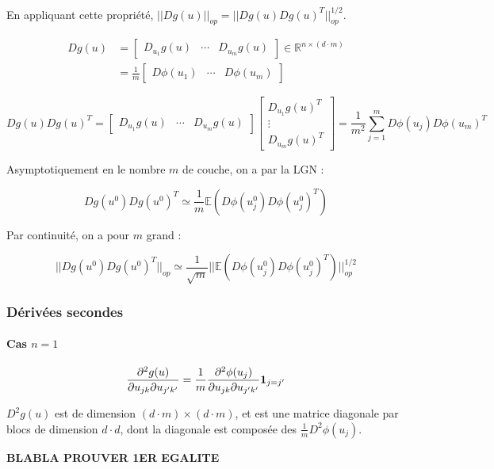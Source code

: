 \documentclass[a4paper, 11pt, french]{article}
\theoremstyle{definition}
\begin{document}
	En appliquant cette propriété, $||Dg(u)||_{op} = ||Dg(u)Dg(u)^T||_{op}^{1/2}$.
	
	\begin{align*}
		Dg(u) &=
		\begin{bmatrix}
			D_{u_1}g(u) & \cdots & D_{u_m}g(u)
		\end{bmatrix} \in \mathbb{R}^{n \times (d\cdot m)}\\
		&= \frac{1}{m} \begin{bmatrix}
			D \phi(u_1) & \cdots & D \phi(u_m)
		\end{bmatrix}
	\end{align*}

	\[ 
	Dg(u) Dg(u)^T =
	\begin{bmatrix}
		D_{u_1}g(u) & \cdots & D_{u_m}g(u)
	\end{bmatrix}
	\begin{bmatrix}
		D_{u_1}g(u)^T \\
		 \vdots \\
		  D_{u_m}g(u)^T
	\end{bmatrix}
	= \frac{1}{m^2} \sum_{j=1}^{m} D \phi(u_j) D \phi(u_m)^T
	\]
	
	Asymptotiquement en le nombre $m$ de couche, on a par la LGN :
	
	\[Dg(u^0) Dg(u^0)^T \simeq \frac{1}{m} \mathbb{E}(D \phi(u^0_j) D \phi(u^0_j)^T)\]
	
	Par continuité, on a pour $m$ grand :
	
	\[||Dg(u^0) Dg(u^0)^T||_{op} \simeq \frac{1}{\sqrt{m}} ||\mathbb{E}(D \phi(u^0_j) D \phi(u^0_j)^T)||_{op}^{1/2}\]
	
	
	\subsubsection{Dérivées secondes}
	
	\paragraph{Cas $n = 1$}
	
	\[\frac{\partial^2 g(u)}{\partial u_{jk} \partial u_{j'k'}} = \frac{1}{m} \frac{\partial^2 \phi (u_j)}{\partial u_{jk} \partial u_{j'k'}} {\bf 1}_{j = j'} \]
	
	$D^2 g(u)$ est de dimension $(d\cdot m) \times (d\cdot m)$, et est une matrice diagonale par blocs de dimension $d\cdot d$, dont la diagonale est composée des $\frac{1}{m} D^2 \phi (u_j)$.
	
	{\bf BLABLA PROUVER 1ER EGALITE}
	
\end{document}
